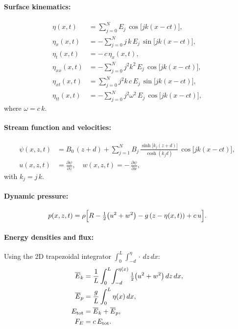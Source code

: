 \documentclass[11pt,letterpaper]{article}
\begin{document}
\paragraph{Surface kinematics:}
\begin{align}
\eta(x,t) &= \sum_{j=0}^{N} E_{j}\,\cos\bigl[jk(x - ct)\bigr], \\[0.5ex]
\eta_{x}(x,t) &= -\sum_{j=0}^{N} j\,k\,E_{j}\,\sin\bigl[jk(x - ct)\bigr], \\[0.5ex]
\eta_{t}(x,t) &= -\,c\,\eta_{x}(x,t), \\[0.5ex]
\eta_{xx}(x,t) &= -\sum_{j=0}^{N} j^{2}k^{2}\,E_{j}\,\cos\bigl[jk(x - ct)\bigr], \\[0.5ex]
\eta_{xt}(x,t) &= \sum_{j=0}^{N} j^{2}k\,c\,E_{j}\,\sin\bigl[jk(x - ct)\bigr], \\[0.5ex]
\eta_{tt}(x,t) &= -\sum_{j=0}^{N} j^{2}\omega^{2}\,E_{j}\,\cos\bigl[jk(x - ct)\bigr],
\end{align}
where \(\omega = c\,k\).

\paragraph{Stream function and velocities:}
\begin{align}
\psi(x,z,t) 
&= B_{0}\,(z + d) 
   + \sum_{j=1}^{N} B_{j}\,
     \frac{\sinh\!\bigl[k_{j}(z + d)\bigr]}{\cosh(k_{j}d)}\,
     \cos\bigl[jk(x - ct)\bigr], 
   \\[0.5ex]
u(x,z,t) &= \frac{\partial \psi}{\partial z}, 
\quad
w(x,z,t) = -\,\frac{\partial \psi}{\partial x},
\end{align}
with \(k_{j}=j\,k\).

\paragraph{Dynamic pressure:}
\begin{equation}
p(x,z,t)
= \rho\Bigl[R - \tfrac12\bigl(u^{2}+w^{2}\bigr) - g\,(z - \eta(x,t)) + c\,u\Bigr].
\end{equation}

\paragraph{Energy densities and flux:}  
Using the 2D trapezoidal integrator \(\int_{0}^{L}\!\int_{-d}^{\eta}\!\cdot\,dz\,dx\):
\begin{align}
\overline{E}_{k} 
&= \frac{1}{L}\int_{0}^{L}\!\int_{-d}^{\eta(x)} \tfrac12\bigl(u^{2}+w^{2}\bigr)\,dz\,dx, 
\\
\overline{E}_{p} 
&= \frac{g}{L}\int_{0}^{L} \eta(x)\,dx, 
\\
E_{\rm tot} 
&= \overline{E}_{k} + \overline{E}_{p}, 
\\
F_{E} 
&= c\,E_{\rm tot}.
\end{align}
\end{document}
